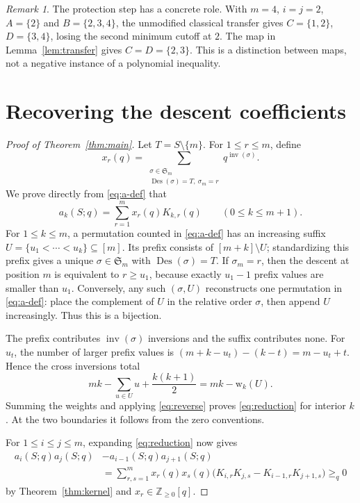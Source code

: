 \documentclass[11pt,a4paper]{article}
\theoremstyle{remark}
\newtheorem{remark}[theorem]{Remark}
\DeclareMathOperator{\Des}{Des}
\DeclareMathOperator{\inv}{inv}
\newcommand{\NN}{\mathbb Z_{\geq0}}
\newcommand{\Sym}{\mathfrak S}
\newcommand{\wt}{\mathrm w}
\begin{document}
\begin{remark}
The protection step has a concrete role. With $m=4$, $i=j=2$,
$A=\{2\}$ and $B=\{2,3,4\}$, the unmodified classical transfer
\cite[Section 2]{Krattenthaler} gives
$C=\{1,2\}$, $D=\{3,4\}$, losing the second minimum cutoff at $2$.
The map in Lemma~\ref{lem:transfer} gives $C=D=\{2,3\}$.
This is a distinction between maps, not a negative instance of a
polynomial inequality.
\end{remark}

\section{Recovering the descent coefficients}

\begin{proof}[Proof of Theorem~\ref{thm:main}]
Let $T=S\setminus\{m\}$. For $1\leq r\leq m$, define
\[
 x_r(q)=\sum_{\substack{\sigma\in\Sym_m\\
                   \Des(\sigma)=T,\ \sigma_m=r}}q^{\inv(\sigma)}.
\]
We prove directly from \eqref{eq:a-def} that
\begin{equation}\label{eq:reduction}
 a_k(S;q)=\sum_{r=1}^m x_r(q)K_{k,r}(q)
 \qquad(0\leq k\leq m+1).
\end{equation}
For $1\leq k\leq m$, a permutation counted in \eqref{eq:a-def} has
an increasing suffix $U=\{u_1<\cdots<u_k\}\subseteq[m]$.
Its prefix consists of $[m+k]\setminus U$; standardizing this prefix
gives a unique $\sigma\in\Sym_m$ with $\Des(\sigma)=T$.
If $\sigma_m=r$, then the descent at position $m$ is equivalent to
$r\geq u_1$, because exactly $u_1-1$ prefix values are smaller than
$u_1$. Conversely, any such $(\sigma,U)$ reconstructs one permutation
in \eqref{eq:a-def}: place the complement of $U$ in the relative order
$\sigma$, then append $U$ increasingly. Thus this is a bijection.

The prefix contributes $\inv(\sigma)$ inversions and the suffix
contributes none. For $u_t$, the number of larger prefix values is
$(m+k-u_t)-(k-t)=m-u_t+t$. Hence the cross inversions total
\[
 mk-\sum_{u\in U}u+\frac{k(k+1)}2=mk-\wt_k(U).
\]
Summing the weights and applying \eqref{eq:reverse} proves
\eqref{eq:reduction} for interior $k$. At the two boundaries it follows
from the zero conventions.

For $1\leq i\leq j\leq m$, expanding \eqref{eq:reduction} now gives
\begin{align*}
 a_i(S;q)a_j(S;q)&-a_{i-1}(S;q)a_{j+1}(S;q)\\
 &=\sum_{r,s=1}^m x_r(q)x_s(q)
       \bigl(K_{i,r}K_{j,s}-K_{i-1,r}K_{j+1,s}\bigr)\geq_q0
\end{align*}
by Theorem~\ref{thm:kernel} and $x_r\in\NN[q]$.


\end{proof}
\end{document}

